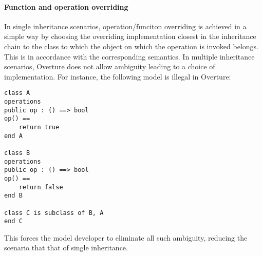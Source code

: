 \paragraph{Function and operation overriding}
%
In single inheritance scenarios, operation/funciton overriding is achieved in a simple way by choosing the overriding implementation closest in the inheritance chain to the class to which the object on which the operation is invoked belongs.
%
This is in accordance with the corresponding semantics.
%
In multiple inheritance scenarios, Overture does not allow ambiguity leading to a choice of implementation.
%
For instance, the following model is illegal in Overture:
%
%
%
\begin{lstlisting}[language=VDM++,frame=tlbr]
class A
operations
public op : () ==> bool
op() ==
	return true
end A

class B
operations
public op : () ==> bool
op() ==
	return false
end B

class C is subclass of B, A
end C
\end{lstlisting}
%
This forces the model developer to eliminate all such ambiguity, reducing the scenario that that of single inheritance.
